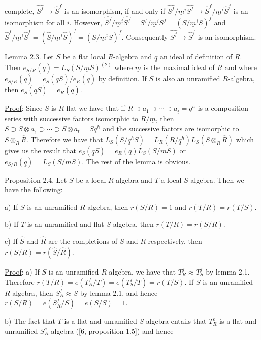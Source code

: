 complete, $\widehat{S^f}\longrightarrow\widehat S^f$ is an isomorphism, if and only if $\widehat{S^f}/\underline m^i\widehat{S^f}\longrightarrow
\widehat S^f/\underline m^i\widehat S^f$ is an isomorphism for all $i$. However, $\widehat{S^f}/\underline m^i\widehat{S^f}=S^f/\underline m^iS^f=
(S/\underline m^iS)^f$ and $\widehat S^f/\underline m^i\widehat S^f=(\widehat S/\underline m^i\widehat S)^f=(S/\underline m^iS)^f$. Consequently $\widehat{S^f}\longrightarrow\widehat S^f$ is
an isomorphism.

Lemma 2.3. Let $S$ be a flat local $R$-algebra and $\underline q$ an ideal of definition
of $R$. Then $e_{S/R}(\underline q)=L_S(S/\underline m S)^{(2)}$ where $\underline m$ is the maximal ideal of $R$ and
where $e_{S/R}(\underline q)=e_S(\underline q S)/e_R(\underline q)$ by definition. If $S$ is also an unramified
$R$-algebra, then $e_S(\underline q S)=e_R(\underline q)$.

\uline{Proof}: Since $S$ is $R$-flat we have that if $R\supset a_1\supset\cdots\supset\underline a_t=q^h$
is a composition series with successive factors isomorphic to $R/\underline m$, then
$S\supset S\otimes\underline a_1\supset\cdots\supset S\otimes a_t=Sq^h$ and the successive factors are isomorphic
to $S\otimes_R\overline R$. Therefore we have that $L_S(S/\underline q^hS)=L_R(R/\underline q^h)L_S(S\otimes_R\overline R)$ which
gives us the result that $e_S(\underline q S)=e_R(q)L_S(S/\underline m S)$ or $e_{S/R}(\underline q)=L_S(S/\underline m S)$. The
rest of the lemma is obvious.

Proposition 2.4. Let $S$ be a local $R$-algebra and $T$ a local $S$-algebra.
Then we have the following:

a) If $S$ is an unramified $R$-algebra, then $r(S/R)=1$ and $r(T/R)=r(T/S)$.

b) If $T$ is an unramified and flat $S$-algebra, then $r(T/R)=r(S/R)$.

c) If $\widehat S$ and $\widehat R$ are the completions of $S$ and $R$ respectively, then
$r(S/R)=r(\widehat S/\widehat R)$.

\uline{Proof}: a) If $S$ is an unramified $R$-algebra, we have that $T_R^f\approx T_S^f$
by lemma 2.1. Therefore $r(T/R)=e(T_R^f/T)=e(T_S^f/T)=r(T/S)$. If $S$ is an
unramified $R$-algebra, then $S_R^f\approx S$ by lemma 2.1, and hence $r(S/R)=e(S_R^f/S)=
e(S/S)=1$.

b) The fact that $T$ is a flat and unramified $S$-algebra entails that
$T_R^e$ is a flat and unramified $S_R^e$-algebra ([6, proposition 1.5]) and hence
